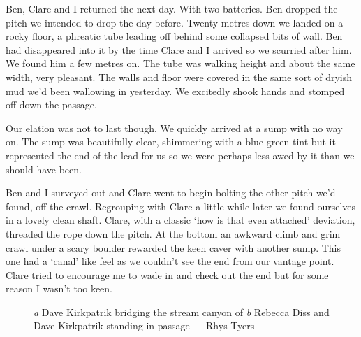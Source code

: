 \begin{marginfigure}
\end{marginfigure}
Ben, Clare and I returned the next day. With two batteries. Ben dropped the pitch we intended to drop the day before. Twenty metres down we landed on a rocky floor, a phreatic tube leading off behind some collapsed bits of wall. Ben had disappeared into it by the time Clare and I arrived so we scurried after him. We found him a few metres on. The tube was walking height and about the same width, very pleasant. The walls and floor were covered in the same sort of dryish mud we'd been wallowing in yesterday. We excitedly shook hands and stomped off down the passage.
 
Our elation was not to last though. We quickly arrived at a sump with no way on. The sump was beautifully clear, shimmering with a blue green tint but it represented the end of the lead for us so we were perhaps less awed by it than we should have been.
 
Ben and I surveyed out and Clare went to begin bolting the other pitch we'd found, off the crawl. Regrouping with Clare a little while later we found ourselves in a lovely clean shaft. Clare, with a classic `how is that even attached' deviation, threaded the rope down the pitch. At the bottom an awkward climb and grim crawl under a scary boulder rewarded the keen caver with another sump. This one had a `canal' like feel as we couldn't see the end from our vantage point. Clare tried to encourage me to wade in and check out the end but for some reason I wasn't too keen.
 
  \begin{figure}[t!]
\checkoddpage \ifoddpage \forcerectofloat \else \forceversofloat \fi
\centering
\begin{subfigure}[t]{0.495\textwidth}
\centering
{}
 \caption{}\label{water hallelujah}
\end{subfigure}
    \hfill
    \begin{subfigure}[t]{0.495\textwidth}
        \centering
        \caption{} \label{Diss and Dave}
    \end{subfigure}
    \caption{
    \emph{a} Dave Kirkpatrik bridging the stream canyon of 
    \emph{b} Rebecca Diss and Dave Kirkpatrik standing in  passage --- Rhys Tyers}
\end{figure}
 

